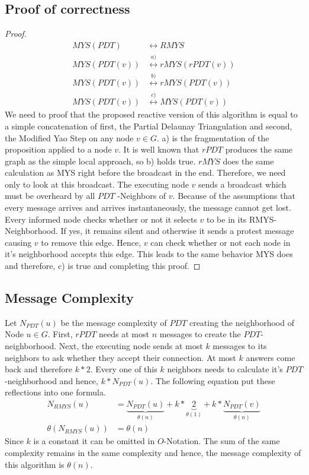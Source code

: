 \subsection{Proof of correctness}
\begin{proof}
\begin{equation*}
\begin{split}
	MYS(PDT) &\leftrightarrow RMYS\\
	MYS(PDT(v)) &\stackrel{a)}{\leftrightarrow} rMYS(rPDT(v)) \\
    MYS(PDT(v)) &\stackrel{b)}{\leftrightarrow} rMYS(PDT(v))\\
    MYS(PDT(v)) &\stackrel{c)}{\leftrightarrow} MYS(PDT(v)) 
\end{split}
\end{equation*}
We need to proof that the proposed reactive version of this algorithm is equal to a simple concatenation of first, the Partial Delaunay Triangulation and second, the Modified Yao Step on any node $v \in G$.
a) is the fragmentation of the proposition applied to a node $v $.
It is well known that $rPDT $ produces the same graph as the simple local approach, so b) holds true.
$rMYS $ does the same calculation as MYS right before the broadcast in the end.
Therefore, we need only to look at this broadcast.
The executing node $v $ sends a broadcast which must be overheard by all $PDT $ -Neighbors of $v $.
Because of the assumptions that every message arrives and arrives instantaneously, the message cannot get lost.
Every informed node checks whether or not it selects $v $ to be in its RMYS-Neighborhood.
If yes, it remains silent and otherwise it sends a protest message causing $v $ to remove this edge.
Hence, $v $ can check whether or not each node in it's neighborhood accepts this edge.
This leads to the same behavior MYS does and therefore, c) is true and completing this proof.
\end{proof}

\subsection{Message Complexity}
\label{message_complexity}
Let $N_{PDT}(u) $ be the message complexity of $PDT $ creating the neighborhood of Node $u \in G$.
First, $rPDT $ needs at most $n $ messages to create the $PDT $-neighborhood.
Next, the executing node sends at most $k $ messages to its neighbors to ask whether they accept their connection.
At most $k $ answers come back and therefore $k * 2 $.
Every one of this $k $ neighbors needs to calculate it's $PDT $-neighborhood and hence, $k*N_{PDT}(u) $.
The following equation put these reflections into one formula.
\begin{equation*}
\begin{split}
N_{RMYS}(u) &= \underbrace{N_{PDT}(u)}_{\theta (n)} +k *\underbrace{2}_{\theta (1)} + k*\underbrace{N_{PDT}(v)}_{\theta (n)} \\
\theta (N_{RMYS}(u)) &= \theta (n) 
\end{split}
\end{equation*}
Since $k $ is a constant it can be omitted in $O $-Notation.
The sum of the same complexity remains in the same complexity and hence, the message complexity of this algorithm is $\theta (n) $.

